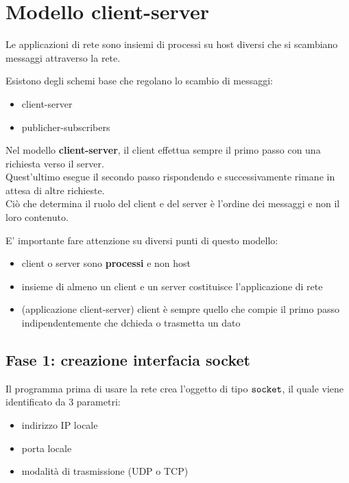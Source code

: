 \documentclass[12pt, a4paper, oneside]{book}
\begin{document}
    \section{Modello client-server}
    Le applicazioni di rete sono insiemi di processi su host diversi che si scambiano messaggi attraverso la rete.

    Esistono degli schemi base che regolano lo scambio di messaggi:
    \begin{itemize}[label=$\circ$]
      \item client-server
      \smallskip
      \item publicher-subscribers
    \end{itemize}

    Nel modello \textcolor{azzurrino}{\textbf{client-server}}, il client effettua sempre il primo passo con una richiesta verso il server.\\[0.2ex]
    Quest'ultimo esegue il secondo passo rispondendo e successivamente rimane in attesa di altre richieste.\\[0.2ex]
    Ciò che determina il ruolo del client e del server è l'ordine dei messaggi e non il loro contenuto.


    E' importante fare attenzione su diversi punti di questo modello:
    \begin{itemize}[label=$\triangleright$]
      \item client o server sono \textbf{processi} e non host
      \smallskip
      \item insieme di almeno un client e un server costituisce l'applicazione di rete
      \smallskip
      \item (applicazione client-server) client è sempre quello che compie il primo passo indipendentemente che dchieda o trasmetta un dato
    \end{itemize}

    \subsection{Fase 1: creazione interfacia socket}
    Il programma prima di usare la rete crea l'oggetto di tipo $\verb|socket|$, il quale viene identificato da 3 parametri:
    \begin{itemize}[label=$\triangleright$]
      \item indirizzo IP locale
      \smallskip
      \item porta locale
      \smallskip
      \item modalità di trasmissione (UDP o TCP)
    \end{itemize}
\end{document}
